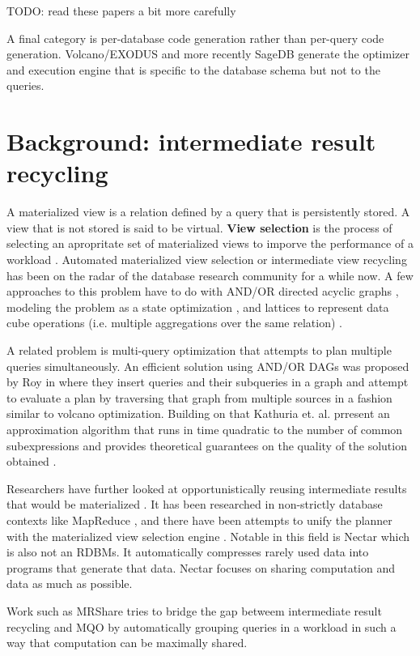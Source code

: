 TODO: read these papers a bit more carefully

A final category is per-database code generation rather than per-query
code generation. Volcano/EXODUS
\cite{graefeVolcanoOptimizerGenerator1993a} and more recently SageDB
\cite{kraskaSageDBLearnedDatabase} generate the optimizer and execution
engine that is specific to the database schema but not to the queries.


\section{Background: intermediate result recycling}
\label{sec:org1a32ec6}
A materialized view is a relation defined by a query that is
persistently stored. A view that is not stored is said to be
virtual. \textbf{View selection} is the process of selecting an apropritate
set of materialized views to imporve the performance of a workload
\cite{mamiSurveyViewSelection2012}.  Automated materialized view
selection or intermediate view recycling has been on the radar of the
database research community for a while now. A few approaches to this
problem have to do with AND/OR directed acyclic graphs
\cite{guptaSelectionViewsMaterialize1997}, modeling the problem as a
state optimization \cite{theodoratosDataWarehouseConfiguration1997},
and lattices to represent data cube operations (i.e. multiple
aggregations over the same relation) \cite{ImplementingDataCubes}.

A related problem is multi-query optimization
\cite{theodoratosDataWarehouseConfiguration1997} that attempts to plan
multiple queries simultaneously. An efficient solution using AND/OR
DAGs was proposed by Roy in \cite{royEfficientExtensibleAlgorithms2000}
where they insert queries and their subqueries in a graph and attempt
to evaluate a plan by traversing that graph from multiple sources in a
fashion similar to volcano optimization. Building on that Kathuria
et. al. prresent an approximation algorithm that runs in time
quadratic to the number of common subexpressions and provides
theoretical guarantees on the quality of the solution obtained
\cite{kathuriaEfficientProvableMultiquery2017}.

Researchers have further looked at opportunistically reusing
intermediate results that would be materialized
\cite{ivanovaArchitectureRecyclingIntermediates2010,nagelRecyclingPipelinedQuery2013}. It
has been researched in non-strictly database contexts like MapReduce
\cite{elghandourReStoreReusingResults2012a}, and there have been
attempts to unify the planner with the materialized view selection
engine \cite{perezHistoryawareQueryOptimization2014a}. Notable in this
field is Nectar \cite{gundaNectarAutomaticManagement2010} which is also
not an RDBMs. It automatically compresses rarely used data into
programs that generate that data. Nectar focuses on sharing
computation and data as much as possible.

Work such as MRShare \cite{nykielMRShareSharingMultiple2010} tries to
bridge the gap betweem intermediate result recycling and MQO by
automatically grouping queries in a workload in such a way that
computation can be maximally shared.
